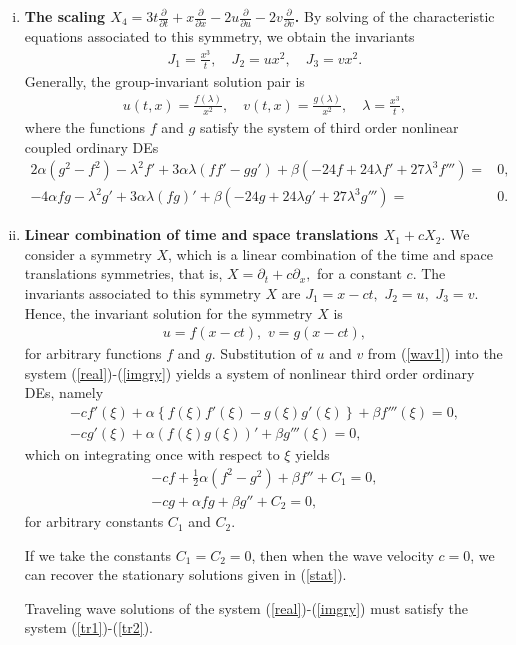 \begin{enumerate} [(i)]
\item \textbf{The scaling  $X_4 =3t \frac{ \partial }{ \partial t} + x\frac{ \partial}{ \partial x} - 2 u \frac{ \partial }{ \partial u}-2 v \frac{ \partial }{ \partial v}$.
} \newline
By solving of the characteristic equations associated to this symmetry, we obtain the invariants 
\begin{align} J_1 = \frac{x^3}{t}, \quad  J_2 =ux^2,  \quad  J_3 = vx^2.
\end{align}
Generally, the group-invariant solution pair is 
\begin{align}
	u(t,x)=  \frac{f(\lambda) }{x^2},\quad  v(t,x)= \frac{g(\lambda) }{x^2}, \quad  \lambda=\frac{x^3}{t},
\end{align} where  the functions $ f$ and $g$ satisfy  the system of third order nonlinear  coupled  ordinary DEs
\begin{align}
2 \alpha (g^2-f^2)- \lambda^2 f'  +3 \alpha \lambda (ff'-gg') + \beta (-24f + 24 \lambda f'  + 27\lambda^3 f''' )=&0,\\
-4\alpha fg-  \lambda^2 g'  + 3 \alpha \lambda(fg)' + \beta (-24g + 24 \lambda g' +27 \lambda^3g''' )=&0.
\end{align} 
\item \textbf{Linear combination of time and space translations	$X_1 + c X_2$}. \newline
We consider a symmetry $X$, which is a linear combination of the time and space translations symmetries,  that is, 
$
X= \partial_t+ c \partial_x,
$ for a constant $c$.
The invariants associated to this symmetry $X$ are 
$
J_1 = x-ct, \,\, J_2 =u, \,\,   J_3 =v.
$
Hence, the invariant solution for the symmetry  $X$ is 
\begin{align} \label{wav1} 
u = f(x-ct), \,\, v=g(x-ct), 
\end{align}  
for arbitrary functions $f$ and $g$. Substitution of $u$ and $v$ from  (\ref{wav1}) into the system (\ref{real})-(\ref{imgry}) yields a system of nonlinear third order ordinary DEs, namely \begin{align}
-cf' (\xi)+ \alpha \left\lbrace f (\xi) f' (\xi)- g (\xi) g' (\xi) \right\rbrace  + \beta f''' (\xi)=0,\\
-cg' (\xi)+ \alpha ( f (\xi)g (\xi))'+ \beta g'''(\xi)=0,
\end{align} 
which on integrating once with respect to $\xi$ yields
\begin{align}
 \label{tr1}
 -c f + \frac{1}{2} \alpha (f^2-g^2) + \beta f''+C_1=0, \\
 \label{tr2} -cg+ \alpha f g + \beta g''+ C_2 =0,
\end{align} 
for arbitrary constants $ C_1$ and $C_2$.
\begin{rem} If we take the constants $ C_1=C_2=0$, then when the wave velocity $c=0$, we can recover the stationary solutions given in (\ref{stat}).
\end{rem}
\begin{rem} Traveling wave solutions of the system (\ref{real})-(\ref{imgry}) must satisfy the system (\ref{tr1})-(\ref{tr2}).	
\end{rem}
\end{enumerate}
